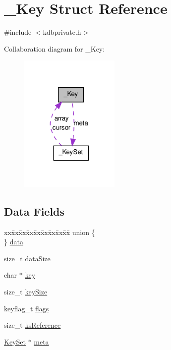 \hypertarget{struct__Key}{
\section{\_\-Key Struct Reference}
\label{struct__Key}
}


{\ttfamily \#include $<$kdbprivate.h$>$}



Collaboration diagram for \_\-Key:
\nopagebreak
\begin{figure}[H]
\begin{center}
\leavevmode
\includegraphics[width=137pt]{struct__Key__coll__graph}
\end{center}
\end{figure}
\subsection*{Data Fields}
\begin{DoxyCompactItemize}
\item 
\begin{tabbing}
xx\=xx\=xx\=xx\=xx\=xx\=xx\=xx\=xx\=\kill
union \{\\
\} \hyperlink{struct__Key_adc2c86e77553ed8224c9516487299459}{data}\\

\end{tabbing}\item 
size\_\-t \hyperlink{struct__Key_a4fd6239c6f82dd78181d6b497ff30f7e}{dataSize}
\item 
char $\ast$ \hyperlink{struct__Key_a652aa968b98b0797d4d080b51133fed9}{key}
\item 
size\_\-t \hyperlink{struct__Key_ab05bb76f9e389692dcea59f581e76323}{keySize}
\item 
keyflag\_\-t \hyperlink{struct__Key_a84a30dda173b302305eca6af5f766bc7}{flags}
\item 
size\_\-t \hyperlink{struct__Key_ab8fe2e580d4ab3952a071c25550598ef}{ksReference}
\item 
\hyperlink{struct__KeySet}{KeySet} $\ast$ \hyperlink{struct__Key_ad1596880712126bad997404b176872f5}{meta}
\end{DoxyCompactItemize}


